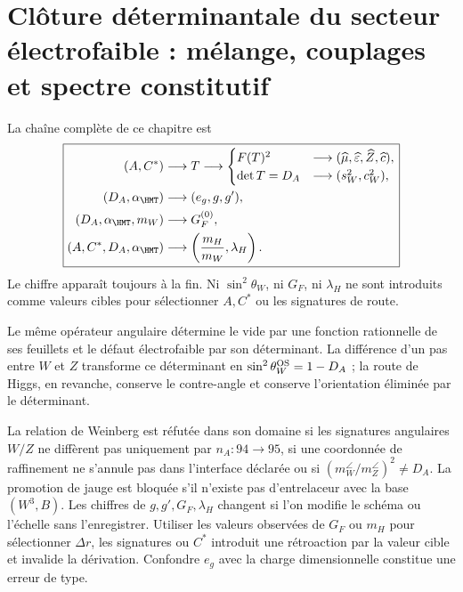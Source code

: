 \section{Clôture déterminantale du secteur électrofaible : mélange, couplages et spectre constitutif}

La chaîne complète de ce chapitre est
\begin{equation}
\label{eq:ew-causal-diagram}
\boxed{
\begin{aligned}
(A,C^*)&\longrightarrow T
\longrightarrow
\begin{cases}
F(T)^2&\longrightarrow
(\widehat\mu,\widehat\varepsilon,\widehat Z,\widehat c),\\
\det T=D_A&\longrightarrow
(s_W^2,c_W^2),
\end{cases}\\
(D_A,\alpha_{\HMT})&\longrightarrow(e_g,g,g'),\\
(D_A,\alpha_{\HMT},m_W)&\longrightarrow G_F^{(0)},\\
(A,C^*,D_A,\alpha_{\HMT})&\longrightarrow
\left(\frac{m_H}{m_W},\lambda_H\right).
\end{aligned}}
\end{equation}
Le chiffre apparaît toujours à la fin. Ni \(\sin^2\theta_W\), ni
\(G_F\), ni \(\lambda_H\) ne sont introduits comme valeurs cibles pour sélectionner
\(A,C^*\) ou les signatures de route.

\begin{proposition}
Le même opérateur angulaire détermine le vide par une fonction rationnelle
de ses feuillets et le défaut électrofaible par son déterminant. La
différence d'un pas entre \(W\) et \(Z\) transforme ce déterminant en
\(\sin^2\theta_W^{\rm OS}=1-D_A\) ; la route de Higgs, en revanche, conserve
le contre-angle et conserve l'orientation éliminée par le déterminant.
\end{proposition}

\begin{remark}
La relation de Weinberg est réfutée dans son domaine si les signatures
angulaires \(W/Z\) ne diffèrent pas uniquement par \(n_A:94\to95\), si une coordonnée
de raffinement ne s'annule pas dans l'interface déclarée ou si
\((m_W^{\angle}/m_Z^{\angle})^2\neq D_A\). La promotion de jauge est
bloquée s'il n'existe pas d'entrelaceur avec la base \((W^3,B)\). Les chiffres
de \(g,g',G_F,\lambda_H\) changent si l'on modifie le schéma ou l'échelle sans
l'enregistrer. Utiliser les valeurs observées de \(G_F\) ou \(m_H\) pour sélectionner
\(\Delta r\), les signatures ou \(C^*\) introduit une rétroaction par la
valeur cible et invalide la dérivation. Confondre \(e_g\) avec la charge
dimensionnelle constitue une erreur de type.
\end{remark}

